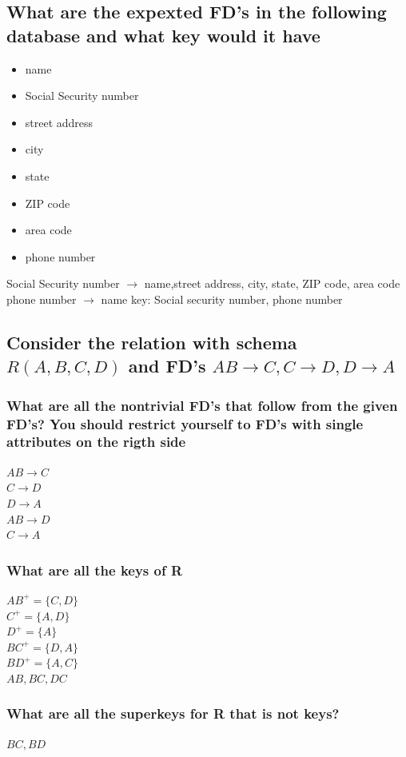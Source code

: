 \documentclass[12pt, a4paper]{article}
\begin{document}
		\subsection{What are the expexted FD's in the following database and what key would it have}
			\begin{itemize}
				\item name
				\item Social Security number
				\item street address
				\item city
				\item state
				\item ZIP code
				\item area code
				\item phone number
			\end{itemize}
			Social Security number $\rightarrow$ name,street address, city, state, ZIP code, area code\\
			phone number $\rightarrow$ name
			key: Social security number, phone number
		\subsection{Consider the relation with schema $R(A,B,C,D)$ and FD's $AB\rightarrow C,C\rightarrow D,D\rightarrow A$}
			\subsubsection{What are all the nontrivial FD's that follow from the given FD's? You should restrict yourself to FD's with single attributes on the rigth side}
				$AB\rightarrow C$\\
				$C\rightarrow D$\\
				$D\rightarrow A$\\
				$AB\rightarrow D$\\
				$C\rightarrow A$
			\subsubsection{What are all the keys of R}
				$AB^+=\{C,D\}$\\
				$C^+=\{A,D\}$\\
				$D^+=\{A\}$\\
				$BC^+=\{D,A\}$\\
				$BD^+=\{A,C\}$\\
				$AB,BC,DC$
			\subsubsection{What are all the superkeys for R that is not keys?}
				$BC,BD$	
\end{document}
